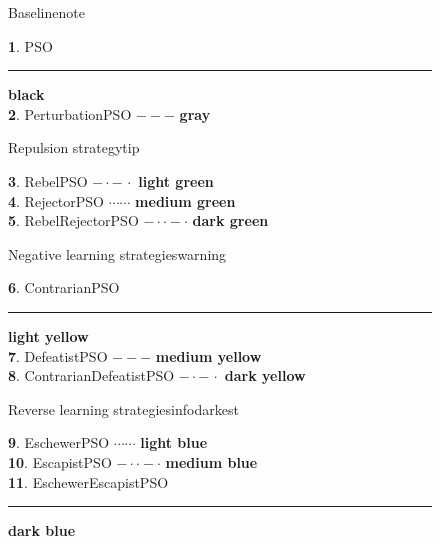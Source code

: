 \begin{figure}[H]
\begin{tcbraster}[
    raster columns=2, 
    raster equal height, 
    nobeforeafter, 
    raster column skip=.1cm
]
\begin{colorblock}{Baseline}{note}
\begin{scriptsize}
\textbf{1}. PSO \quad \rule[0.5ex]{2em}{0.35pt} \colorbox{kit-gray100}{\color{white}\textbf{black}}\\
\textbf{2}. PerturbationPSO \quad $- - -$  \colorbox{kit-gray50}{\color{white}\textbf{gray}}\end{scriptsize}
\end{colorblock}
\begin{colorblock}{Repulsion strategy}{tip}
\begin{scriptsize}
\textbf{3}. RebelPSO \quad $\mathbf{- \cdot -\, \cdot }$ \colorbox{tiplight}{\textbf{light green}} \\
\textbf{4}. RejectorPSO \quad $\mathbf{\cdots\cdots }$ \colorbox{tipmedium}{\textbf{medium green}} \\
\textbf{5}. RebelRejectorPSO \quad $\mathbf{- \cdot \cdot - \cdot}$ \colorbox{tipdark}{\textbf{dark green}} \end{scriptsize}
\end{colorblock}
\end{tcbraster}

\begin{tcbraster}[
    raster columns=2, 
    raster equal height, 
    nobeforeafter, 
    raster column skip=.1cm
]
\begin{colorblock}{Negative learning strategies}{warning}
\begin{scriptsize}
\textbf{6}. ContrarianPSO \quad \rule[0.5ex]{2em}{0.35pt} \colorbox{warninglight}{\textbf{light yellow}} \\
\textbf{7}. DefeatistPSO \quad $- - -$ \colorbox{warningpale}{\textbf{medium yellow}}\\
\textbf{8}. ContrarianDefeatistPSO \quad $\mathbf{- \cdot -\, \cdot }$ \colorbox{warningmedium}{\textbf{dark yellow}}\end{scriptsize}
\end{colorblock}
\begin{colorblock}{Reverse learning strategies}{infodarkest}
\begin{scriptsize}
\textbf{9}. EschewerPSO \quad $\mathbf{\cdots\cdots }$ \colorbox{infolight}{\textbf{light blue}} \\
\textbf{10}. EscapistPSO \quad$\mathbf{- \cdot \cdot - \cdot}$  \colorbox{infomediumpale}{\textbf{medium blue}}\\
\textbf{11}. EschewerEscapistPSO \quad  \rule[0.5ex]{2em}{0.35pt} \colorbox{infodarklight}{\textbf{dark blue}}\end{scriptsize}
\end{colorblock}
\end{tcbraster}


\end{figure}
